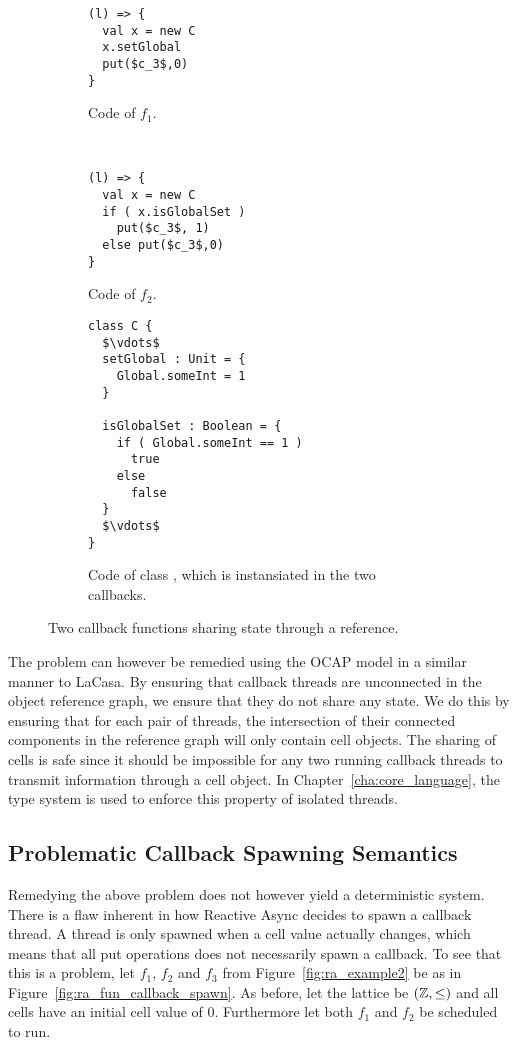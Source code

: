 \begin{figure}
  \centering
  \begin{subfigure}[b]{0.4\textwidth}
    \begin{lstlisting}
(l) => {
  val x = new C
  x.setGlobal
  put($c_3$,0)
}
    \end{lstlisting}
    \caption{Code of $f_1$.}
  \end{subfigure}
  ~
  \begin{subfigure}[b]{0.4\textwidth}
    \begin{lstlisting}
(l) => {
  val x = new C
  if ( x.isGlobalSet )
    put($c_3$, 1)
  else put($c_3$,0)
}
    \end{lstlisting}
    \caption{Code of $f_2$.}
  \end{subfigure}

  \begin{subfigure}[b]{0.5\textwidth}
    \begin{lstlisting}
class C {
  $\vdots$
  setGlobal : Unit = {
    Global.someInt = 1
  }

  isGlobalSet : Boolean = {
    if ( Global.someInt == 1 ) 
      true
    else 
      false
  }
  $\vdots$
}
    \end{lstlisting}
    \caption{Code of class , which is instansiated in the two callbacks.}
  \end{subfigure}
  \caption{Two callback functions sharing state through a reference.}
  \label{fig:ra_fun_shared_state_ref}
\end{figure}


The problem can however be remedied using the OCAP model in a similar manner to
LaCasa.  By ensuring that callback threads are unconnected in the object
reference graph, we ensure that they do not share any state. We do this by
ensuring that for each pair of threads, the intersection of their connected
components in the reference graph will only contain cell objects. The sharing of
cells is safe since it should be impossible for any two running callback threads
to transmit information through a cell object. In
Chapter~\ref{cha:core_language}, the type system is used to enforce this
property of isolated threads.

\subsection{Problematic Callback Spawning Semantics}%
\label{sub:problematic_callback_spawning_semantics}

Remedying the above problem does not however yield a deterministic system.
There is a flaw inherent in how Reactive Async decides to spawn a callback
thread. A thread is only spawned when a cell value actually changes, which means
that all put operations does not necessarily spawn a callback. To see that this
is a problem, let $f_1$, $f_2$ and $f_3$ from Figure~\ref{fig:ra_example2} be as in
Figure~\ref{fig:ra_fun_callback_spawn}. As before, let the lattice be
$(\mathbb{Z}, \leq)$ and all cells have an initial cell value of $0$. Furthermore
let both $f_1$ and $f_2$ be scheduled to run.

